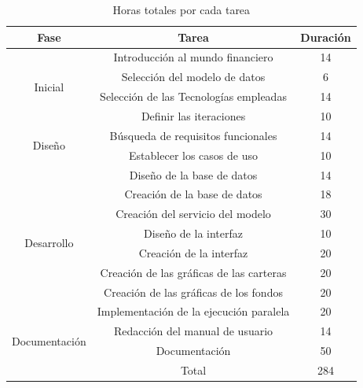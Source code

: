 \documentclass[12pt, a4paper]{book}
\begin{document}
\begin{table}[htbp]
	\centering
	\caption{Horas totales por cada tarea}
	\label{horas}
	\begin{tabular}{@{}c|c|c|@{}}
		\toprule
		\multicolumn{1}{|c|}{Fase}                           & Tarea                                    & Duración \\ \midrule
		\multicolumn{1}{|c|}{\multirow{4}{*}{Inicial}}       & Introducción al mundo financiero         & 14       \\ \cmidrule(l){2-3} 
		\multicolumn{1}{|c|}{}                               & Selección del modelo de datos            & 6        \\ \cmidrule(l){2-3} 
		\multicolumn{1}{|c|}{}                               & Selección de las Tecnologías empleadas   & 14       \\ \cmidrule(l){2-3} 
		\multicolumn{1}{|c|}{}                               & Definir las iteraciones                  & 10       \\ \midrule
		\multicolumn{1}{|c|}{\multirow{2}{*}{Diseño}}        & Búsqueda de requisitos funcionales       & 14       \\ \cmidrule(l){2-3} 
		\multicolumn{1}{|c|}{}                               & Establecer los casos de uso              & 10       \\ \midrule
		\multicolumn{1}{|c|}{\multirow{8}{*}{Desarrollo}}    & Diseño de la base de datos               & 14       \\ \cmidrule(l){2-3} 
		\multicolumn{1}{|c|}{}                               & Creación de la base de datos             & 18       \\ \cmidrule(l){2-3} 
		\multicolumn{1}{|c|}{}                               & Creación del servicio del modelo         & 30       \\ \cmidrule(l){2-3} 
		\multicolumn{1}{|c|}{}                               & Diseño de la interfaz                    & 10       \\ \cmidrule(l){2-3} 
		\multicolumn{1}{|c|}{}                               & Creación de la interfaz                  & 20       \\ \cmidrule(l){2-3} 
		\multicolumn{1}{|c|}{}                               & Creación de las gráficas de las carteras & 20       \\ \cmidrule(l){2-3} 
		\multicolumn{1}{|c|}{}                               & Creación de las gráficas de los fondos   & 20       \\ \cmidrule(l){2-3} 
		\multicolumn{1}{|c|}{}                               & Implementación de la ejecución paralela  & 20       \\ \midrule
		\multicolumn{1}{|c|}{\multirow{2}{*}{Documentación}} & Redacción del manual de usuario          & 14       \\ \cmidrule(l){2-3} 
		\multicolumn{1}{|c|}{}                               & Documentación                            & 50       \\ \midrule
		\multicolumn{1}{l|}{}                                & Total                                    & 284      \\ \cmidrule(l){2-3} 
	\end{tabular}
\end{table}
\end{document}
